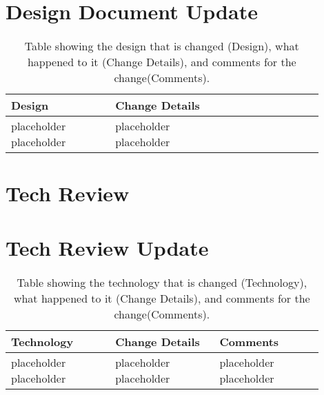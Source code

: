 \documentclass[10pt,journal,compsoc,draftclsnofoot]{IEEEtran}
\begin{document}
\begin{flushleft}
\newpage



\section{Design Document Update}

\begin{center}
\begin{table}[H]
\caption{Table showing the design that is changed (Design), what happened to it (Change Details), and comments for the change(Comments).}
\begin{tabular}{ | p{0.3\linewidth} | p{0.3\linewidth} | p{0.3\linewidth} | }
\hline
\textbf{Design}  & \textbf{Change Details} \\ \hline

placeholder placeholder & 
placeholder placeholder \\ \hline

\end{tabular}
\newline
\label{table:DesignDocumentUpdate}
\end{table}
\end{center}


\newpage

\section{Tech Review}

\newpage



\section{Tech Review Update}

\begin{center}
\begin{table}[H]
\caption{Table showing the technology that is changed (Technology), what happened to it (Change Details), and comments for the change(Comments).}
\begin{tabular}{ | p{0.3\linewidth} | p{0.3\linewidth} | p{0.3\linewidth} | }
\hline
\textbf{Technology}  & \textbf{Change Details}  & \textbf{Comments} \\ \hline

placeholder placeholder & 
placeholder placeholder & 
placeholder placeholder \\ \hline


\end{tabular}
\end{table}
\end{center}
\end{flushleft}
\end{document}

